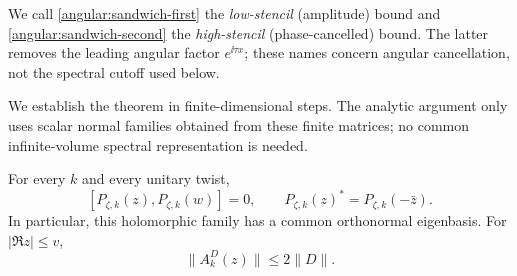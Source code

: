 We call \eqref{angular:sandwich-first} the \emph{low-stencil}
(amplitude) bound and \eqref{angular:sandwich-second} the
\emph{high-stencil} (phase-cancelled) bound.  The latter removes the
leading angular factor $e^{\ii\tau x}$; these names concern angular
cancellation, not the spectral cutoff used below.

We establish the theorem in finite-dimensional steps.  The analytic
argument only uses scalar normal families obtained from these finite
matrices; no common infinite-volume spectral representation is needed.

\begin{lemma}\label{angular:basic-rows}
For every $k$ and every unitary twist,
\begin{equation}\label{angular:normal-rows}
 [P_{\zeta,k}(z),P_{\zeta,k}(w)]=0,\qquad
 P_{\zeta,k}(z)^*=P_{\zeta,k}(-\bar z).
\end{equation}
In particular, this holomorphic family has a common orthonormal
eigenbasis.  For $|\Re z|\le v$,
\begin{equation}\label{angular:row-bound}
 \|A_k^D(z)\|\le2\|D\|.
\end{equation}
\end{lemma}

